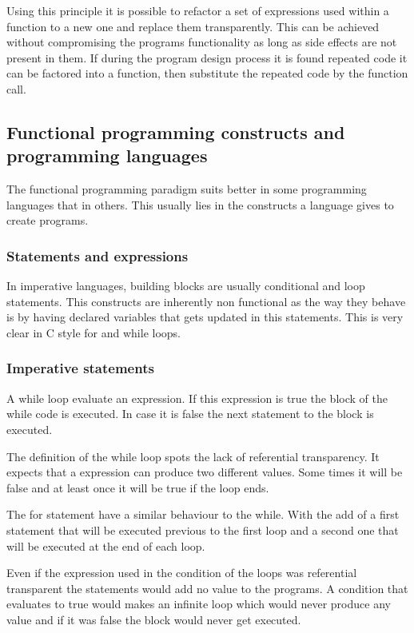 \documentclass[../main.tex]{subfiles}
\begin{document}
Using this principle it is possible to refactor a set of expressions used within
a function to a new one and replace them transparently. This can be achieved
without compromising the programs functionality as long as side effects are not
present in them. If during the program design process it is found repeated code
it can be factored into a function, then substitute the repeated code by the
function call.

\subsection{Functional programming constructs and programming languages} The
functional programming paradigm suits better in some programming languages that
in others. This usually lies in the constructs a language gives to create
programs.

\subsubsection{Statements and expressions} In imperative languages, building
blocks are usually conditional and loop statements. This constructs are
inherently non functional as the way they behave is by having declared variables
that gets updated in this statements. This is very clear in C style for and
while loops.

\subsubsection{Imperative statements} A while loop evaluate an expression. If
this expression is true the block of the while code is executed. In case it is
false the next statement to the block is executed.

The definition of the while loop spots the lack of referential transparency. It
expects that a expression can produce two different values. Some times it will
be false and at least once it will be true if the loop ends.

The for statement have a similar behaviour to the while. With the add of a first
statement that will be executed previous to the first loop and a second one that
will be executed at the end of each loop.

Even if the expression used in the condition of the loops was referential
transparent the statements would add no value to the programs. A condition that
evaluates to true would makes an infinite loop which would never produce any
value and if it was false the block would never get executed.
\end{document}
